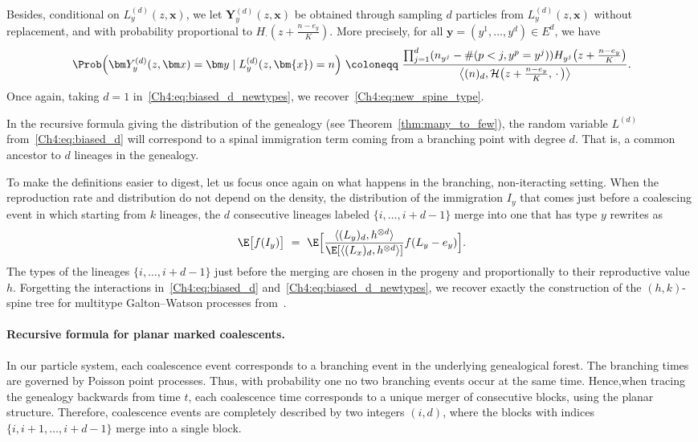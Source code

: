 \begin{refsegment}
Besides, conditional on $L^{(d)}_y(z, \bm{x})$, we let $\bm{Y}^{(d)}_y(z,\bm x)$ be obtained through sampling $d$ particles from $L^{(d)}_y(z,\bm{x})$ without replacement, and with probability proportional to $H_\cdot(z
+ \frac{n-e_y}{K})$. More precisely, for all $\bm y=(y^1,\ldots,y^d)\in E^d$, we have
\begin{equation}\label{Ch4:eq:biased_d_newtypes}
\Prob\Big(\bm Y^{(d)}_y(z,\bm x) = \bm y \mid  L^{(d)}_y(z,\bm{x}) = n\Big) 
\ \coloneqq\   
 \frac{\prod_{j=1}^d (n_{y^j}-\#(p<j, y^p =y^j)) H_{y^j}\big(z+\frac{n-e_y}{K}\big)}{\big\langle (n)_d, \mathcal H \big(z+\frac{n-e_y}{K},\, \cdot\, \big)\big\rangle}.
\end{equation}
Once again, taking $d=1$ in~\eqref{Ch4:eq:biased_d_newtypes}, we recover~\eqref{Ch4:eq:new_spine_type}.


In the recursive formula giving the distribution of the genealogy (see Theorem~\ref{thm:many_to_few}), the random variable $L^{(d)}$ from~\eqref{Ch4:eq:biased_d} will correspond to a spinal immigration term coming from a branching point with degree $d$. That is, a common ancestor to $d$ lineages in the genealogy. 
\begin{rem}
   To make the definitions easier to digest, let us focus once again on what happens in the branching, non-iteracting setting. When the reproduction rate and distribution do not depend on the density, the distribution of the immigration $I_{y}$ that comes just before a coalescing event in which starting from $k$ lineages, the $d$ consecutive lineages labeled $\{i,\ldots, i+d-1\}$ merge into one that has type $y$ rewrites as 
\[ 
\E\big[f(I_y)\big]\ =\ \E\Big[\frac{\langle (L_y)_d, h^{\otimes d}\rangle }{\E[\langle (L_x)_d, h^{\otimes d}\rangle]}f(L_y-e_y)\Big].
\]
The types of the lineages  $\{i,\ldots, i+d-1\}$  just before the merging are chosen in the progeny and proportionally to their reproductive value $h$. 
Forgetting the interactions in~\eqref{Ch4:eq:biased_d} and~\eqref{Ch4:eq:biased_d_newtypes}, we recover exactly the construction of the $(h,k)$-spine tree for multitype Galton--Watson processes from~\cite{Foutel_Schertzer}.
\end{rem}


\paragraph{Recursive formula for planar marked coalescents.}
In our particle system, each coalescence event corresponds to a branching event in the underlying genealogical forest. The branching times are governed by Poisson point processes. Thus, with probability one no two branching events occur at the same time. Hence,when tracing the genealogy backwards from time $t$, each coalescence time corresponds to a unique merger of consecutive blocks,  using the planar structure.
Therefore, coalescence events are completely described by two integers $(i,d)$, where the blocks with indices $\{i,i+1,\ldots,i+d-1\}$
merge into a single block.


\end{refsegment}
